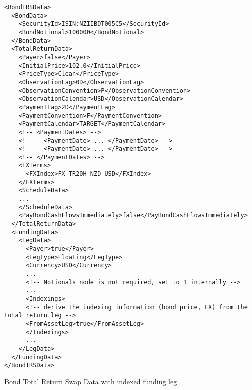 \begin{listing}[H]
\begin{verbatim}
<BondTRSData>
  <BondData>
    <SecurityId>ISIN:NZIIBDT005C5</SecurityId>
    <BondNotional>100000</BondNotional>
  </BondData>
  <TotalReturnData>
    <Payer>false</Payer>
    <InitialPrice>102.0</InitialPrice>
    <PriceType>Clean</PriceType>
    <ObservationLag>0D</ObservationLag>
    <ObservationConvention>P</ObservationConvention>
    <ObservationCalendar>USD</ObservationCalendar>
    <PaymentLag>2D</PaymentLag>
    <PaymentConvention>F</PaymentConvention>
    <PaymentCalendar>TARGET</PaymentCalendar>
    <!-- <PaymentDates> -->
    <!--   <PaymentDate> ... </PaymentDate> -->
    <!--   <PaymentDate> ... </PaymentDate> -->
    <!-- </PaymentDates> -->
    <FXTerms>
      <FXIndex>FX-TR20H-NZD-USD</FXIndex>
    </FXTerms>
    <ScheduleData>
    ...
    </ScheduleData>
    <PayBondCashFlowsImmediately>false</PayBondCashFlowsImmediately>
  </TotalReturnData>
  <FundingData>
    <LegData>
      <Payer>true</Payer>
      <LegType>Floating</LegType>
      <Currency>USD</Currency>
      ...
      <!-- Notionals node is not required, set to 1 internally -->
      ...
      <Indexings>
      <!-- derive the indexing information (bond price, FX) from the total return leg -->
      <FromAssetLeg>true</FromAssetLeg>
      </Indexings>
      ...
    </LegData>
  </FundingData>
</BondTRSData>
\end{verbatim}
\caption{Bond Total Return Swap Data with indexed funding leg}
\label{lst:bondtrsdata}
\end{listing}
